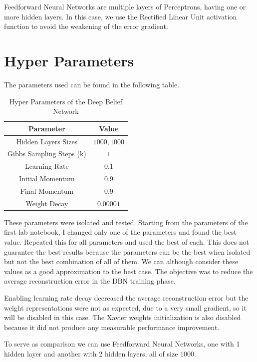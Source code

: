 \documentclass[a4paper, 11pt]{article}
\begin{document}
		Feedforward Neural Networks are multiple layers of Perceptrons, having one or more hidden layers.
		In this case, we use the Rectified Linear Unit activation function to avoid the weakening of the error gradient.
		
	
	\section{Hyper Parameters}
		The parameters used can be found in the following table.
		\begin{table}[H]
			\centering
			\begin{tabular}{c|c}
				\textbf{Parameter} 		& \textbf{Value} 	\\ \hline
				Hidden Layers Sizes 	& $ 1000,1000 $    	\\ \hline
				Gibbs Sampling Steps (k)&  $ 1 $      		\\ \hline
				Learning Rate			&  $ 0.1 $     		\\ \hline
				Initial Momentum		&  $ 0.9 $    		\\ \hline
				Final Momentum			&  $ 0.9 $    		\\ \hline
				Weight Decay			&  $ 0.00001 $      \\
			\end{tabular}
			\caption{Hyper Parameters of the Deep Belief Network}
			\label{tab:pars}
		\end{table}
		
		These parameters were isolated and tested.
		Starting from the parameters of the first lab notebook, I changed only one of the parameters and found the best value.
		Repeated this for all parameters and used the best of each.
		This does not guarantee the best results because the parameters can be the best when isolated but not the best combination of all of them.
		We can although consider these values as a good approximation to the best case.
		The objective was to reduce the average reconstruction error in the DBN training phase.
		
		Enabling learning rate decay decreased the average reconstruction error but the weight representations were not as expected, due to a very small gradient, so it will be disabled in this case.	
		The Xavier weights initialization is also disabled because it did not produce any measurable performance improvement.
		
		To serve as comparison we can use Feedforward Neural Networks, one with 1 hidden layer and another with 2 hidden layers, all of size $ 1000 $.
		
\end{document}
